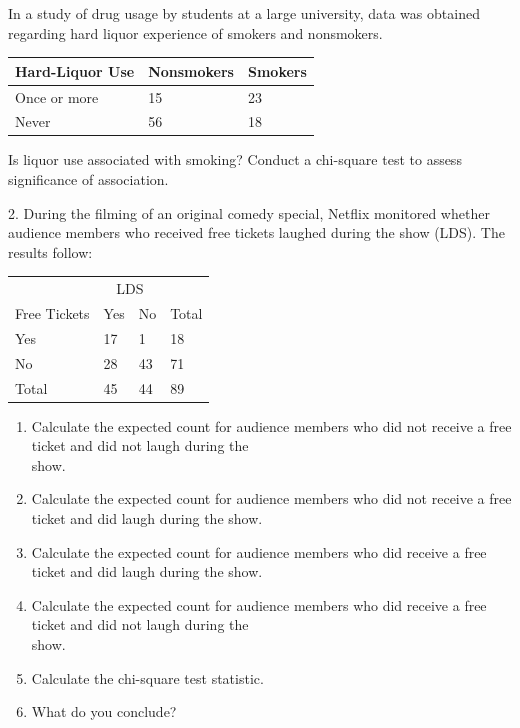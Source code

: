 \documentclass[11pt, chapterprefix=true]{scrbook}\usepackage[]{graphicx}\usepackage[]{color}
\begin{document}
\begin{exercises}
\begin{exercise} %

In a study of drug usage by students at a large university, data was obtained regarding hard liquor experience of smokers and nonsmokers.

{\small{
\begin{tabular}{@{} lll @{}} \hline
Hard-Liquor Use & Nonsmokers & Smokers \\ \hline
Once or more & 15 & 23 \\
Never        & 56 & 18 \\ \hline
\end{tabular}
}}

Is liquor use associated with smoking?  Conduct a chi-square test to assess significance of association.

\end{exercise}
\begin{solution} %

\end{solution}

\begin{exercise} %

2.	During the filming of an original comedy special, Netflix monitored whether audience members who received free tickets laughed during the show (LDS). The results follow:

\begin{table}[ht]
\centering
\begin{tabular}{@{} llll @{}} \hline
& \multicolumn{2}{c}{LDS} \\
Free Tickets & Yes & No & Total \\ \hline
Yes & 17 & 1  & 18 \\
No  & 28 & 43 & 71  \\ \hline
Total & 45 & 44 & 89 \\ \hline
\end{tabular}
\end{table}

\begin{enumerate}
  \item Calculate the expected count for audience members who did not receive a free ticket and did not laugh during the \\ show.
  \item Calculate the expected count for audience members who did not receive a free ticket and did laugh during the show.
  \item Calculate the expected count for audience members who did receive a free \\ ticket and did laugh during the show.
  \item Calculate the expected count for audience members who did receive a free \\ ticket and did not laugh during the \\ show.
  \item Calculate the chi-square test statistic.
  \item What do you conclude?
\end{enumerate}


\end{exercise}
\end{exercises}
\end{document}
